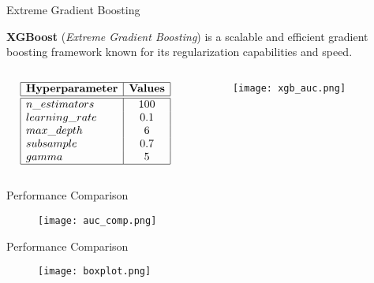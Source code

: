 \begin{frame}{Extreme Gradient Boosting}

    \textbf{XGBoost} (\textit{Extreme Gradient Boosting}) is a scalable and efficient gradient boosting framework known for its regularization capabilities and speed.

    \vspace{-1em}

    \begin{columns}
        \begin{column}{0.45\textwidth}
            {\small
            $$
            \begin{array}{|l|c|}
                \hline
                \textbf{Hyperparameter} & \textbf{Values} \\
                \hline
                \hline
                n\_estimators & 100 \\
                learning\_rate & 0.1 \\
                max\_depth & 6 \\
                subsample & 0.7 \\
                gamma & 5 \\
                \hline
            \end{array}
            $$
            }
        \end{column}
        \begin{column}{0.55\textwidth}
            \begin{figure}
                \centering
                \vfill
                \texttt{[image: xgb\_auc.png]}
            \end{figure}
        \end{column}
    \end{columns}
\end{frame}

\begin{frame}{Performance Comparison}

    \begin{figure}
        \centering
        \vfill
        \texttt{[image: auc\_comp.png]}
    \end{figure}

\end{frame}

\begin{frame}{Performance Comparison}

    \begin{figure}
        \centering
        \vfill
        \texttt{[image: boxplot.png]}
    \end{figure}

\end{frame}
